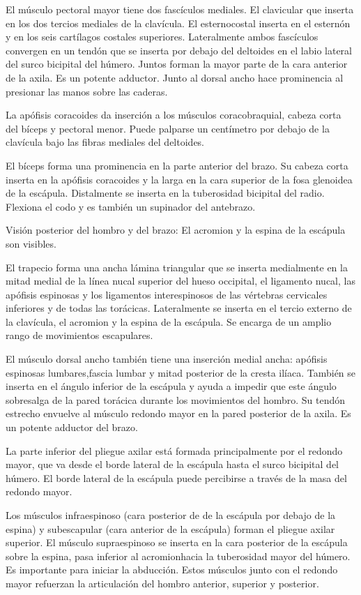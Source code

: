 El músculo pectoral mayor tiene dos fascículos mediales. El clavicular que inserta en los dos tercios mediales de la clavícula. El esternocostal inserta en el esternón y en los seis cartílagos costales superiores. Lateralmente ambos fascículos convergen en un tendón  que se inserta por debajo del deltoides en el labio lateral del surco bicipital del húmero. Juntos forman la mayor parte de la cara anterior de la axila. Es un potente adductor. Junto al dorsal ancho hace prominencia al presionar las manos sobre las caderas.

La apófisis coracoides da inserción a los músculos coracobraquial, cabeza corta del bíceps y pectoral menor. Puede palparse un centímetro por debajo de la clavícula bajo las fibras mediales del deltoides.

El bíceps forma una prominencia en la parte anterior del brazo. Su cabeza corta inserta en la apófisis coracoides y la larga en la cara superior de la fosa glenoidea de la escápula. Distalmente se inserta en la tuberosidad bicipital del radio. Flexiona el codo y es también un supinador del antebrazo.

Visión posterior del hombro y del brazo: El acromion y la espina de la escápula son visibles.

El trapecio forma una ancha lámina triangular que se inserta medialmente en la mitad medial de la línea nucal superior del hueso occipital, el ligamento nucal, las apófisis espinosas y los ligamentos interespinosos de las vértebras cervicales inferiores y de todas las torácicas. Lateralmente se inserta en el tercio externo de la clavícula, el acromion y la espina de la escápula. Se encarga de un amplio rango de movimientos escapulares.

El músculo dorsal ancho también tiene una inserción medial ancha: apófisis espinosas lumbares,fascia lumbar y mitad posterior de la cresta ilíaca. También se inserta en el ángulo inferior de la escápula y ayuda a impedir que este ángulo sobresalga de la pared torácica durante los movimientos del hombro. Su tendón estrecho envuelve al músculo redondo mayor en la pared posterior de la axila. Es un potente adductor del brazo.

La parte inferior del pliegue axilar está formada principalmente por el redondo mayor, que va desde el borde lateral de la escápula hasta el surco bicipital del húmero. El borde lateral de la escápula puede percibirse a través de la masa del redondo mayor.

Los músculos infraespinoso (cara posterior de de la escápula por debajo de la espina) y subescapular (cara anterior de la escápula) forman el pliegue axilar superior. El músculo supraespinoso se inserta en la cara posterior de la escápula sobre la espina, pasa inferior al acromionhacia la tuberosidad mayor del húmero. Es importante para iniciar la abducción. Estos músculos junto con el redondo mayor refuerzan la articulación del hombro anterior, superior y posterior.

